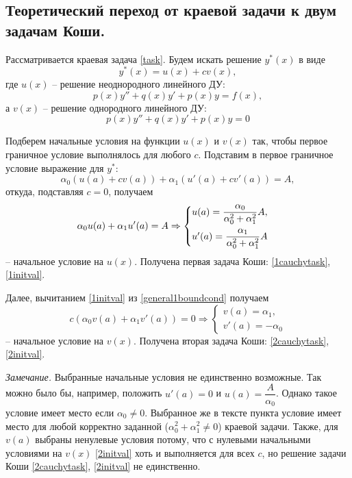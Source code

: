\documentclass[a4paper, 12pt]{article}
\begin{document}
	\subsection{Теоретический переход от краевой задачи к двум задачам Коши.}
	
	Рассматривается краевая задача \eqref{task}. Будем искать решение $y^*(x)$ в виде 
	\begin{equation}
		y^*(x)=u(x)+cv(x),
	\end{equation}
	где $u(x)$ -- решение неоднородного линейного ДУ:
	\begin{equation} \label{1cauchytask}
		p(x)y''+q(x)y'+p(x)y=f(x),
	\end{equation}
	а $v(x)$ -- решение однородного линейного ДУ:
	\begin{equation} \label{2cauchytask}
		p(x)y''+q(x)y'+p(x)y=0
	\end{equation}
	
	Подберем начальные условия на функции $u(x)$ и $v(x)$ так, чтобы первое граничное условие выполнялось для любого $c$. Подставим в первое граничное условие выражение для $y^*$:
	\begin{equation} \label{general1boundcond}
		\alpha_0(u(a)+cv(a))+\alpha_1(u'(a)+cv'(a))=A,
	\end{equation}
	откуда, подставляя $c=0$, получаем
	\begin{equation} \label{1initval}
		\alpha_0u(a)+\alpha_1u'(a)=A \Rightarrow
		\begin{cases}
			u(a) = \dfrac{\alpha_0}{\alpha_0^2+\alpha_1^2}A,\vspace{0.5em}\\
			u'(a) = \dfrac{\alpha_1}{\alpha_0^2+\alpha_1^2}A
		\end{cases}
	\end{equation}
	-- начальное условие на $u(x)$. Получена первая задача Коши: \eqref{1cauchytask}, \eqref{1initval}.
	
	Далее, вычитанием \eqref{1initval} из \eqref{general1boundcond} получаем
	\begin{equation} \label{2initval}
		c(\alpha_0v(a)+\alpha_1v'(a))=0 \Rightarrow
		\begin{cases}
			v(a) = \alpha_1,\\
			v'(a) = -\alpha_0
		\end{cases}
	\end{equation}
	-- начальное условие на $v(x)$. Получена вторая задача Коши: \eqref{2cauchytask}, \eqref{2initval}.
	
	\textit{Замечание.} Выбранные начальные условия не единственно возможные. Так можно было бы, например, положить $u'(a)=0$ и $u(a)=\dfrac{A}{\alpha_0}$. Однако такое условие имеет место если $\alpha_0\neq0$. Выбранное же в тексте пункта условие имеет место для любой корректно заданной ($\alpha_0^2+\alpha_1^2\neq0$) краевой задачи. Также, для $v(a)$ выбраны ненулевые условия потому, что с нулевыми начальными условиями на $v(x)$ \eqref{2initval} хоть и выполняется для всех $c$, но решение задачи Коши \eqref{2cauchytask}, \eqref{2initval} не единственно.
	
\end{document}
